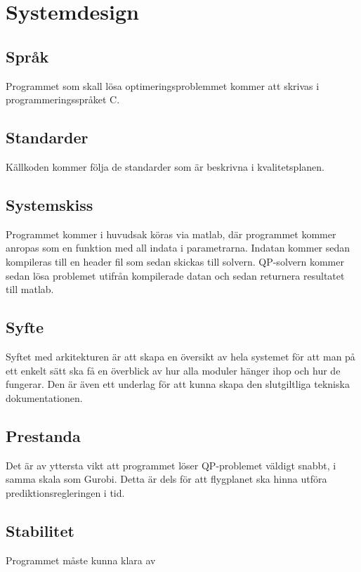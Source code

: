 \section{Systemdesign}

\subsection{Språk}
Programmet som skall lösa optimeringsproblemmet kommer att skrivas i programmeringsspråket C. 

\subsection{Standarder}
Källkoden kommer följa de standarder som är beskrivna i kvalitetsplanen.

\subsection{Systemskiss}
Programmet kommer i huvudsak köras via matlab, där programmet kommer anropas som en funktion med all indata i parametrarna. Indatan kommer sedan kompileras till en header fil som sedan skickas till solvern. QP-solvern kommer sedan lösa problemet utifrån kompilerade datan och sedan returnera resultatet till matlab.



\subsection{Syfte}
Syftet med arkitekturen är att skapa en översikt av hela systemet för att man på ett enkelt sätt ska få en överblick av hur alla moduler hänger ihop och hur de fungerar. Den är även ett underlag för att kunna skapa den slutgiltliga tekniska dokumentationen.

\subsection{Prestanda}
Det är av yttersta vikt att programmet löser QP-problemet väldigt snabbt, i samma skala som Gurobi. Detta är dels för att flygplanet ska hinna utföra prediktionsregleringen i tid.

\subsection{Stabilitet}
Programmet måste kunna klara av
